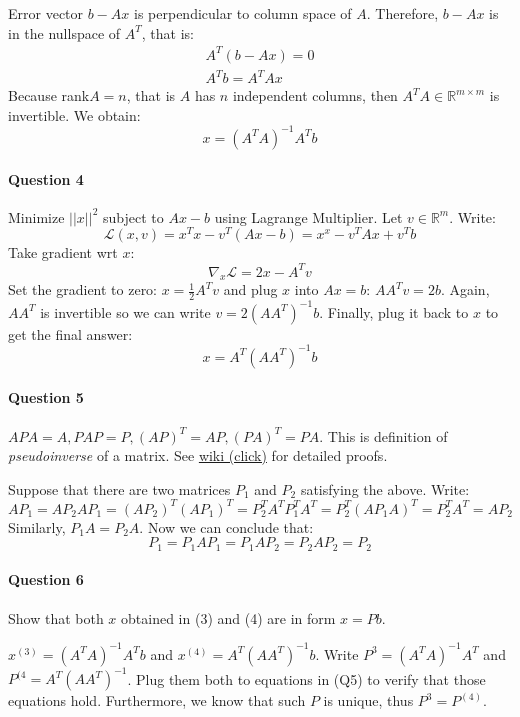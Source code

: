 Error vector $b- Ax$ is perpendicular to column space of $A$.
Therefore, $b-Ax$ is in the nullspace of $A^T$, that is:
\begin{align*}
    A^T(b-Ax) = 0 \\
    A^Tb = A^T Ax
\end{align*}
Because rank$A = n$, that is $A$ has $n$ independent columns, then $A^T A \in \mathbb{R}^{m \times m}$ is invertible.
We obtain:
\begin{equation*}
 x = (A^T A) ^{-1} A^T b   
\end{equation*}


\paragraph{Question 4}
Minimize $||x||^2$ subject to $Ax -b$ using Lagrange Multiplier.
Let $v \in \mathbb{R}^m$.
Write:
\begin{equation*}
    \mathcal{L}(x, v) = x^T x - v^T (Ax - b) = x^x - v^TAx + v^Tb
\end{equation*}
Take gradient wrt $x$:
\begin{equation*}
    \nabla_x \mathcal{L} = 2x - A^Tv
\end{equation*}
Set the gradient to zero: $x = \frac{1}{2}A^T v$ and plug $x$ into $Ax = b$: $AA^T v = 2b$.
Again, $AA^T$ is invertible so we can write $v = 2 (AA^T)^{-1} b $.
Finally, plug it back to $x$ to get the final answer:
\begin{equation*}
    x = A^T (AA^T)^{-1}b
\end{equation*}

\paragraph{Question 5}
$APA = A, PAP = P, (AP)^T = AP, (PA)^T = PA$.
This is definition of \textit{pseudoinverse} of a matrix.
See \href{https://en.wikipedia.org/wiki/Proofs_involving_the_Moore\%E2\%80\%93Penrose_inverse\#Proof_of_uniqueness}{wiki (click)} for detailed proofs.

Suppose that there are two matrices $P_1$ and $P_2$ satisfying the above.
Write:
\begin{equation*}
    AP_1 = A P_2  A P_1 = (AP_2)^T (AP_1)^T = P_2^T  A^T P_1^T A^T =
    P_2^T(AP_1 A)^T = P_2^T A^T = AP_2
 \end{equation*}
Similarly, $P_1 A = P_2 A$.
Now we can conclude that:
\begin{equation*}
    P_1 = P_1 A P _1 = P_1 A P_2 = P_2 A P_2 = P_2
\end{equation*}

\paragraph{Question 6}
Show that both $x$ obtained in (3) and (4) are in form $x = Pb$.

$x^{(3)} = (A^T A) ^{-1} A^T b$ and $x^{(4)} = A^T (AA^T)^{-1}b$. 
Write $P^{3} = (A^T A) ^{-1} A^T$ and $P^{(4} = A^T (AA^T)^{-1}$.
Plug them both to equations in (Q5) to verify that those equations hold.
Furthermore, we know that such $P$ is unique, thus  $P^{3} = P^{(4)}$.



